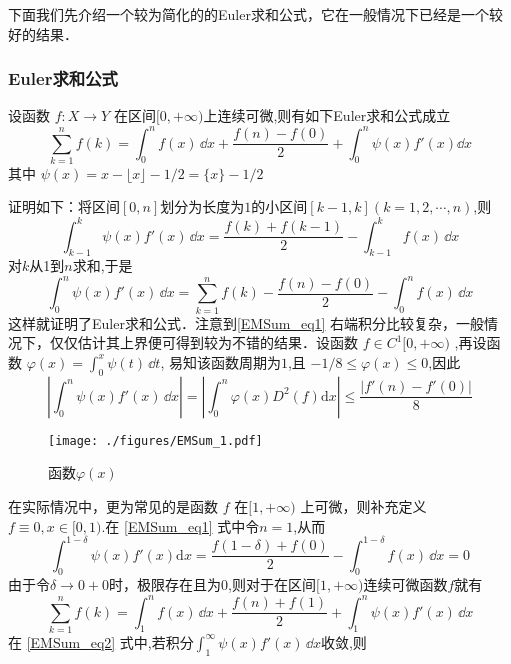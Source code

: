 下面我们先介绍一个较为简化的的Euler求和公式，它在一般情况下已经是一个较好的结果．

\subsubsection{Euler求和公式}

\begin{theorem}{}
设函数 $f:X\to Y$ 在区间$[0,+\infty)$上连续可微,则有如下Euler求和公式成立	
        \begin{equation}\label{EMSum_eq1} 
            \sum_{k=1}^{n}f(k)=\int_{0}^{n}f(x)\,\dd x
            +\frac{f(n)-f(0)}{2}+\int_{0}^{n}\psi(x)f'(x)\dd x
        \end{equation}
    其中 $\psi(x)=x-\lfloor x \rfloor-1/2=\{x\}-1/2$
\end{theorem}
证明如下：将区间$[0,n]$划分为长度为$1$的小区间$[k-1,k](k=1,2,\cdots,n)$,则
​\[
    \int_{k-1}^{k}\psi(x)f'(x)\,\dd x
    =\frac{f(k)+f(k-1)}{2}-\int_{k-1}^{k}f(x)\,\dd x
\]
​对$k$从1到$n$求和,于是
​\[
    \int_{0}^{n}\psi(x)f'(x)\,\dd x
    =\sum_{k=1}^{n}f(k)-\frac{f(n)-f(0)}{2}-\int_{0}^{n}f(x)\,\dd x
\]
这样就证明了Euler求和公式．注意到\autoref{EMSum_eq1} 右端积分比较复杂，一般情况下，仅仅估计其上界便可得到较为不错的结果．设函数 $f\in{C^1[0,+\infty)}$ ,再设函数
$\varphi(x)=\displaystyle{\int_{0}^{x}\psi(t)\,\dd t}$,
易知该函数周期为$1$,且
 $-1/8\leqslant\varphi(x)\leqslant 0$,因此
\[
    \left|\int_{0}^{n}\psi(x)f'(x)\,\dd x\right|
    =\left|\int_{0}^{n}\varphi(x)D^2(f)\mathrm{d}x\right|
    \leqslant\frac{|f'(n)-f'(0)|}{8}
\]
\begin{figure}[ht]
\centering
\texttt{[image: ./figures/EMSum\_1.pdf]}
\caption{函数$\varphi(x)$} \label{EMSum_fig1}
\end{figure}
在实际情况中，更为常见的是函数 $f$ 在$[1,+\infty)$ 上可微，则补充定义$ f\equiv 0,x\in[0,1)$.在 \autoref{EMSum_eq1} 式中令$n=1$,从而
\[
    \int_{0}^{1-\delta}\psi(x)f'(x)\mathrm{d}x
    =\frac{f(1-\delta)+f(0)}{2}-\int_{0}^{1-\delta}f(x)\,\dd x=0
\]
由于令$\delta\to0+0$时，极限存在且为$0$,则对于在区间$[1,+\infty)$连续可微函数$f$就有
\begin{equation}\label{EMSum_eq2}
    \sum_{k=1}^{n}f(k)
    =\int_{1}^{n}f(x)\,\dd x+\frac{f(n)+f(1)}{2}+\int_{1}^{n}\psi(x)f'(x)\,\dd x
\end{equation}
在 \autoref{EMSum_eq2}  式中,若积分$\displaystyle{\int_{1}^{\infty}\psi(x)f'(x)\,\dd x}$收敛,则
